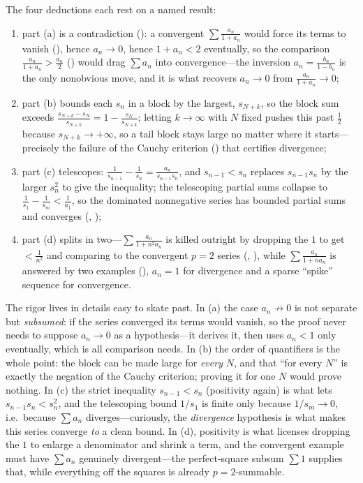 \documentclass[main.tex]{subfiles}
\begin{document}
\begin{Reflection}
The four deductions each rest on a named result:
\begin{enumerate}[leftmargin=1.7em,itemsep=3pt,topsep=2pt,label=\textnormal{(\arabic*)}]
  \item part (a) is a contradiction (): a convergent $\sum\frac{a_n}{1+a_n}$ would force
        its terms to vanish (), hence $a_n\to 0$, hence $1+a_n<2$ eventually, so the
        comparison $\frac{a_n}{1+a_n}>\frac{a_n}{2}$ () would drag $\sum a_n$ into
        convergence---the inversion $a_n=\frac{b_n}{1-b_n}$ is the only nonobvious move, and it is what
        recovers $a_n\to 0$ from $\frac{a_n}{1+a_n}\to 0$;
  \item part (b) bounds each $s_n$ in a block by the largest, $s_{N+k}$, so the block sum exceeds
        $\frac{s_{N+k}-s_N}{s_{N+k}}=1-\frac{s_N}{s_{N+k}}$; letting $k\to\infty$ with $N$ fixed pushes
        this past $\tfrac12$ because $s_{N+k}\to+\infty$, so a tail block stays large no matter where it
        starts---precisely the failure of the Cauchy criterion () that certifies
        divergence;
  \item part (c) telescopes: $\frac{1}{s_{n-1}}-\frac{1}{s_n}=\frac{a_n}{s_{n-1}s_n}$, and
        $s_{n-1}<s_n$ replaces $s_{n-1}s_n$ by the larger $s_n^2$ to give the inequality; the
        telescoping partial sums collapse to $\frac{1}{s_1}-\frac{1}{s_m}<\frac{1}{a_1}$, so the
        dominated nonnegative series has bounded partial sums and converges (,
        );
  \item part (d) splits in two---$\sum\frac{a_n}{1+n^2a_n}$ is killed outright by dropping the $1$ to
        get $<\frac{1}{n^2}$ and comparing to the convergent $p=2$ series (,
        ), while $\sum\frac{a_n}{1+na_n}$ is answered by two examples
        (), $a_n=1$ for divergence and a sparse ``spike'' sequence for convergence.
\end{enumerate}

The rigor lives in details easy to skate past. In (a) the case $a_n\not\to 0$ is not separate but
\emph{subsumed}: if the series converged its terms would vanish, so the proof never needs to suppose
$a_n\to 0$ as a hypothesis---it derives it, then uses $a_n<1$ only eventually, which is all comparison
needs. In (b) the order of quantifiers is the whole point: the block can be made large for \emph{every}
$N$, and that ``for every $N$'' is exactly the negation of the Cauchy criterion; proving it for one $N$
would prove nothing. In (c) the strict inequality $s_{n-1}<s_n$ (positivity again) is what lets
$s_{n-1}s_n<s_n^2$, and the telescoping bound $1/s_1$ is finite only because $1/s_m\to 0$, i.e.\
because $\sum a_n$ diverges---curiously, the \emph{divergence} hypothesis is what makes this series
converge \emph{to} a clean bound. In (d), positivity is what licenses dropping the $1$ to enlarge a
denominator and shrink a term, and the convergent example must have $\sum a_n$ genuinely
divergent---the perfect-square subsum $\sum 1$ supplies that, while everything off the squares is
already $p=2$-summable.


\end{Reflection}
\end{document}
